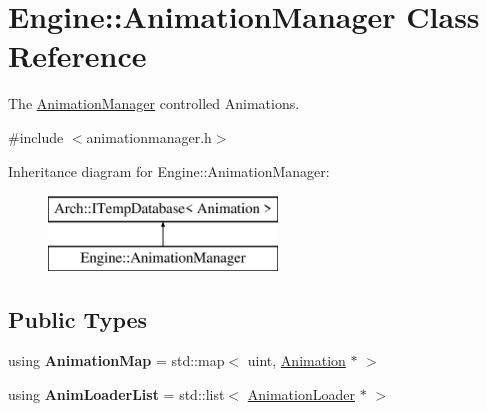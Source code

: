 \hypertarget{classEngine_1_1AnimationManager}{}\section{Engine\+:\+:Animation\+Manager Class Reference}
\label{classEngine_1_1AnimationManager}


The \hyperlink{classEngine_1_1AnimationManager}{Animation\+Manager} controlled Animations.  




{\ttfamily \#include $<$animationmanager.\+h$>$}

Inheritance diagram for Engine\+:\+:Animation\+Manager\+:\begin{figure}[H]
\begin{center}
\leavevmode
\includegraphics[height=2.000000cm]{classEngine_1_1AnimationManager}
\end{center}
\end{figure}
\subsection*{Public Types}
\begin{DoxyCompactItemize}
\item 
\hypertarget{classEngine_1_1AnimationManager_a3625098c28199094ef82056c22414205}{}using {\bfseries Animation\+Map} = std\+::map$<$ uint, \hyperlink{classEngine_1_1Animation}{Animation} $\ast$ $>$\label{classEngine_1_1AnimationManager_a3625098c28199094ef82056c22414205}

\item 
\hypertarget{classEngine_1_1AnimationManager_a97a8ac1d418ab00715d47d2278e608ab}{}using {\bfseries Anim\+Loader\+List} = std\+::list$<$ \hyperlink{classEngine_1_1AnimationLoader}{Animation\+Loader} $\ast$ $>$\label{classEngine_1_1AnimationManager_a97a8ac1d418ab00715d47d2278e608ab}

\end{DoxyCompactItemize}
